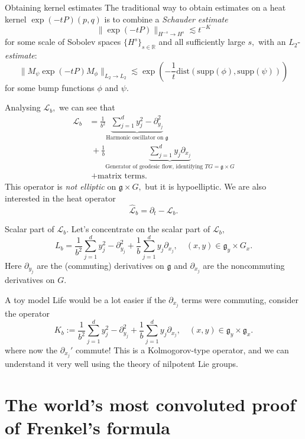 \documentclass{beamer}
\numberwithin{equation}{section}
\theoremstyle{plain}
\theoremstyle{plain}
\theoremstyle{definition}
\theoremstyle{plain}
\theoremstyle{plain}
\theoremstyle{definition}
\newcommand{\Rl}{\mathbb{R}}
\newcommand{\Lc}{\mathcal{L}}
\newcommand{\gf}{\mathfrak{g}}
\begin{document}
\begin{frame}{Obtaining kernel estimates}
  The traditional way to obtain estimates on a heat kernel $\exp(-tP)(p,q)$ is to combine a \emph{Schauder estimate}
  \[
    \|\exp(-tP)\|_{H^{-s}\to H^s} \lesssim t^{-K}
  \]
  for some scale of Sobolev spaces $\{H^s\}_{s\in \Rl}$ and all sufficiently large $s,$ with an $L_2$-\emph{estimate}:
  \[
    \|M_{\psi}\exp(-tP)M_{\phi}\|_{L_2\to L_2} \lesssim \exp(-\frac1t \mathrm{dist}(\mathrm{supp}(\phi),\mathrm{supp}(\psi)))
  \]
  for some bump functions $\phi$ and $\psi.$
\end{frame}

\begin{frame}
  Analysing $\Lc_b,$ we can see that
  \begin{align*}
    \Lc_b &= \frac{1}{b^2}\underbrace{\sum_{j=1}^d y_j^2-\partial_{y_j}^2}_{\text{Harmonic oscillator on } \gf}\\
          &\;+ \frac{1}{b}\underbrace{\sum_{j=1}^d y_j\partial_{x_j}}_{\text{Generator of geodesic flow, identifying }TG=\gf\times G}\\
          &\;+ \text{matrix terms.}
  \end{align*}
  This operator is \emph{not elliptic} on $\gf\times G,$ but it is hypoelliptic. We are also interested in the heat operator
  \[
      \widehat{\Lc}_b = \partial_t-\Lc_b.
  \]
\end{frame}

\begin{frame}{Scalar part of $\Lc_b.$}
  Let's concentrate on the scalar part of $\Lc_b,$
  \[
    L_b =\frac{1}{b^2}\sum_{j=1}^d y_j^2-\partial_{y_j}^2 + \frac{1}{b}\sum_{j=1}^dy_j\partial_{x_j},\quad (x,y) \in \gf_y\times G_x.
  \]
  Here $\partial_{y_j}$ are the (commuting) derivatives on $\gf$ and $\partial_{x_j}$ are the noncommuting derivatives on $G.$
\end{frame}

\begin{frame}{A toy model}
  Life would be a lot easier if the $\partial_{x_j}$ terms were commuting, consider the operator
  \[
    K_b := \frac{1}{b^2}\sum_{j=1}^d y_j^2-\partial_{y_j}^2 + \frac{1}{b}\sum_{j=1}^dy_j\partial_{x_j},\quad (x,y) \in \gf_y\times \gf_x.
  \]
  where now the $\partial_{x_j}'$ commute!
  \pause
  This is a Kolmogorov-type operator, and we can understand it very well using the theory of nilpotent Lie groups.
\end{frame}

\section{The world's most convoluted proof of Frenkel's formula}
\end{document}
